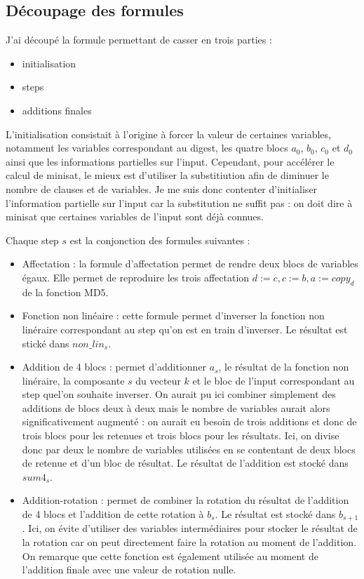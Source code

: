 \documentclass{article}
\begin{document}
\subsection{Découpage des formules}
J'ai découpé la formule permettant de casser en trois parties : 
\begin{itemize}
\item initialisation
\item steps
\item additions finales
\end{itemize}
 
L'initialisation consistait à l'origine à forcer la valeur de certaines variables, notamment les variables correspondant au digest, les quatre blocs $a_0$, $b_0$, $c_0$ et $d_0$ ainsi que les informations partielles sur l'input. Cependant, pour accélérer le calcul de minisat, le mieux est d'utiliser la substitiution afin de diminuer le nombre de clauses et de variables. Je me suis donc contenter d'initialiser l'information partielle sur l'input car la substitution ne suffit pas : on doit dire à minisat que certaines variables de l'input sont déjà connues.
\par
Chaque step $s$ est la conjonction des formules suivantes : 
\begin{itemize}
  \item Affectation : la formule d'affectation permet de rendre deux blocs de variables égaux. Elle permet de reproduire les trois affectation $d:= c, c:=b , a:= copy_d$ de la fonction MD5.
  \item Fonction non linéaire : cette formule permet d'inverser la fonction non linéraire correspondant au step qu'on est en train d'inverser. Le résultat est stické dans $non\_lin_s$.
  \item Addition de 4 blocs : permet d'additionner $a_s$, le résultat de la fonction non linéraire, la composante $s$ du vecteur $k$ et le bloc de l'input correspondant au step quel'on souhaite inverser. On aurait pu ici combiner simplement des additions de blocs deux à deux mais le nombre de variables aurait alors significativement augmenté : on aurait eu besoin de trois additions et donc de trois blocs pour les retenues et trois blocs pour les résultats. Ici, on divise donc par deux le nombre de variables utilisées en se contentant de deux blocs de retenue et d'un bloc de résultat. Le résultat de l'addition est stocké dans $sum4_s$.
  \item Addition-rotation : permet de combiner la rotation du résultat de l'addition de 4 blocs et l'addition de cette rotation à $b_s$. Le résultat est stocké dans $b_{s+1}$. Ici, on évite d'utiliser des variables intermédiaires pour stocker le résultat de la rotation car on peut directement faire la rotation au moment de l'addition. On remarque que cette fonction est également utilisée au moment de l'addition finale avec une valeur de rotation nulle.
\end{itemize}
\end{document}
